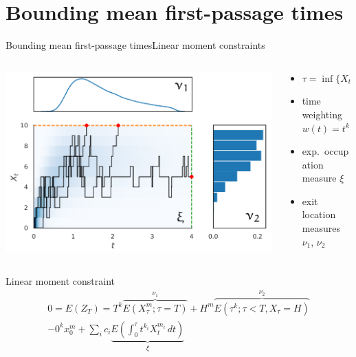 \documentclass[9pt]{beamer}
\newcommand{\expSym}{{E}}
\newcommand{\E}[1]{\ensuremath{\expSym\left(#1\right)}}
\newcommand{\bottomcite}[1]{\vspace*{\fill} {\scriptsize \parencite{#1}}}
\begin{document}
\section{Bounding mean first-passage times}
\begin{frame}{Bounding mean first-passage times}{Linear moment constraints}
    \begin{columns}
        \begin{column}{.4\paperwidth}
            \vspace{5mm}
            \includegraphics[scale=.4]{../gfx/decomp1.pdf}
        \end{column}
        \begin{column}{.45\paperwidth}
            \begin{itemize}
                \item $\tau=\inf\{X_t \geq H \mid t\geq 0\}\land T$
                \item time weighting $w(t)=t^k$
                \item exp.\ occupation measure $\xi$
                \item exit location measures $\nu_1$, $\nu_2$
            \end{itemize}
        \end{column}
    \end{columns}

    \begin{block}{Linear moment constraint}
        \vspace{-3mm}
\begin{multline*}\label{eq:model_constraints}
    0 = \E{Z_T} = T^k\overbrace{\E{X_{\tau}^m;\tau=T}}^{\nu_1} + H^m\overbrace{\E{{\tau}^k;\tau < T, X_{\tau}=H}}^{\nu_2}\\
 	- 0^kx_0^{m}
    + \sum_{i}c_i\underbrace{\E{\int_{0}^{\tau} t^{k_i}X_t^{m_i}\,dt}}_{\xi}
\end{multline*}
    \end{block}
\bottomcite{backenkohler2019bounding}
\end{frame}
\end{document}
